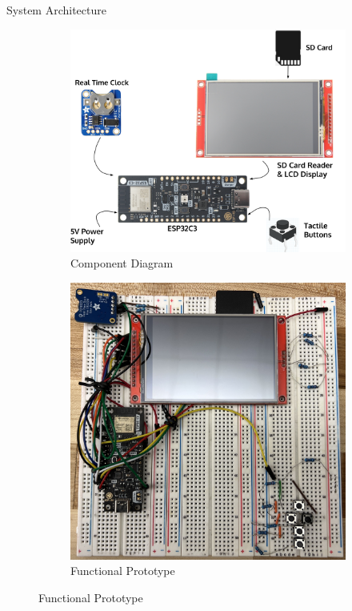 \documentclass[final]{beamer}
\newlength{\colwidth}
\begin{document}
\begin{frame}[t]
\begin{columns}[t]
\begin{column}{\colwidth}
      \begin{block}{System Architecture}
      \begin{figure}
        \begin{subfigure}[t]{0.54\textwidth}
            \includegraphics[width =\textwidth]{PrototypeDesign.png}
            \caption{Component Diagram}
        \end{subfigure}
        \begin{subfigure}[t]{0.44\textwidth}
            \includegraphics[width=\textwidth]{prototype.jpg}
            \caption{Functional Prototype}
        \end{subfigure}
      \end{figure}


\end{block}
\end{column}
\end{columns}
\end{frame}
\end{document}
